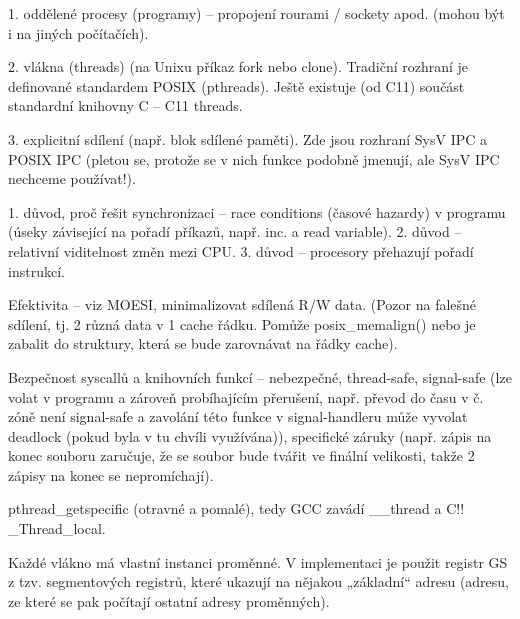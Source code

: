 \documentclass[12pt]{article}                   %
\begin{document}
        \begin{definice}
            1. oddělené procesy (programy) -- propojení rourami / sockety apod. (mohou být i na jiných počítačích).

            2. vlákna (threads) (na Unixu příkaz fork nebo clone). Tradiční rozhraní je definované standardem POSIX (pthreads). Ještě existuje (od C11) součást standardní knihovny C -- C11 threads.

            3. explicitní sdílení (např. blok sdílené paměti). Zde jsou rozhraní SysV IPC a POSIX IPC (pletou se, protože se v nich funkce podobně jmenují, ale SysV IPC nechceme používat!).
        \end{definice}

        \begin{upozorneni}
            1. důvod, proč řešit synchronizaci -- race conditions (časové hazardy) v programu (úseky závisející na pořadí příkazů, např. inc. a read variable). 2. důvod -- relativní viditelnost změn mezi CPU. 3. důvod -- procesory přehazují pořadí instrukcí.

            Efektivita -- viz MOESI, minimalizovat sdílená R/W data. (Pozor na falešné sdílení, tj. 2 různá data v 1 cache řádku. Pomůže posix\_memalign() nebo je zabalit do struktury, která se bude zarovnávat na řádky cache).

            Bezpečnost syscallů a knihovních funkcí -- nebezpečné, thread-safe, signal-safe (lze volat v programu a zároveň probíhajícím přerušení, např. převod do času v č. zóně není signal-safe a zavolání této funkce v signal-handleru může vyvolat deadlock (pokud byla v tu chvíli využívána)), specifické záruky (např. zápis na konec souboru zaručuje, že se soubor bude tvářit ve finální velikosti, takže 2 zápisy na konec se nepromíchají).
        \end{upozorneni}

        \begin{definice}
            pthread\_getspecific (otravné a pomalé), tedy GCC zavádí \_\_thread a C!! \_Thread\_local.

            Každé vlákno má vlastní instanci proměnné. V implementaci je použit registr GS z tzv. segmentových registrů, které ukazují na nějakou „základní“ adresu (adresu, ze které se pak počítají ostatní adresy proměnných).
        \end{definice}
\end{document}
